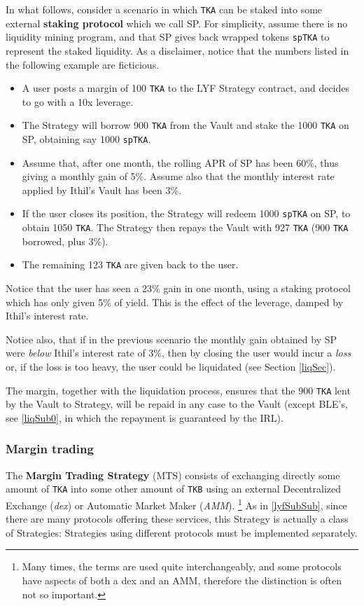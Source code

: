 \documentclass[a4paper,10 pt]{article}
\theoremstyle{definition}
\begin{document}
In what follows, consider a scenario in which \verb|TKA| can be staked into some external {\bf staking protocol} which we call SP. For simplicity, assume there is no liquidity mining program, and that SP gives back wrapped tokens \verb|spTKA| to represent the staked liquidity. As a disclaimer, notice that the numbers listed in the following example are ficticious.

\begin{itemize}
\item A user posts a margin of 100 \verb|TKA| to the LYF Strategy contract, and decides to go with a 10x leverage.
\item The Strategy will borrow 900 \verb|TKA| from the Vault and stake the 1000 \verb|TKA| on SP, obtaining say 1000 \verb|spTKA|.
\item Assume that, after one month, the rolling APR of SP has been 60\%, thus giving a monthly gain of 5\%. Assume also that the monthly interest rate applied by Ithil's Vault has been 3\%.
\item If the user closes its position, the Strategy will redeem 1000 \verb|spTKA| on SP, to obtain 1050 \verb|TKA|. The Strategy then repays the Vault with 927 \verb|TKA| (900 \verb|TKA| borrowed, plus 3\%). 
\item The remaining 123 \verb|TKA| are given back to the user.
\end{itemize}
Notice that the user has seen a 23\% gain in one month, using a staking protocol which has only given 5\% of yield. This is the effect of the leverage, damped by Ithil's interest rate.

Notice also, that if in the previous scenario the monthly gain obtained by SP were {\it below} Ithil's interest rate of $3\%$, then by closing the user would incur a {\it loss} or, if the loss is too heavy, the user could be liquidated (see Section \ref{liqSec}).

The margin, together with the liquidation process, ensures that the $900$ \verb|TKA| lent by the Vault to Strategy, will be repaid in any case to the Vault (except BLE's, see \ref{liqSub0}, in which the repayment is guaranteed by the IRL).

\subsubsection{Margin trading}\label{mtSubSub}

The {\bf Margin Trading Strategy} (MTS) consists of exchanging directly some amount of \verb|TKA| into some other amount of \verb|TKB| using an external Decentralized Exchange ({\it dex}) or Automatic Market Maker ({\it AMM}). \footnote{Many times, the terms are used quite interchangeably, and some protocols have aspects of both a dex and an AMM, therefore the distinction is often not so important.}  As in \ref{lyfSubSub}, since there are many protocols offering these services, this Strategy is actually a class of Strategies: Strategies using different protocols must be implemented separately.
\end{document}
